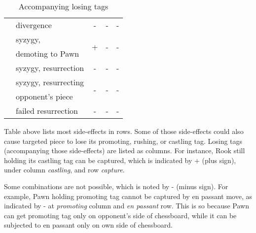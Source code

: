 \begin{table}[!h]
\begin{tabular}{ rlccc }
\alg{/}                     & divergence            & -                    & -                     & -                     \\
\cmidrule{1-5} %
\multirow{2}{*}{\alg{>}}    & syzygy,               & \multirow{2}{*}{+}   & \multirow{2}{*}{-}    & \multirow{2}{*}{-}    \\
                            & demoting to Pawn      &                      &                       &                       \\
\cmidrule{1-5} %
\alg{\$}                    & syzygy, resurrection  & -                    & -                     & -                     \\
\cmidrule{1-5} %
\multirow{2}{*}{\alg{\$\$}} & syzygy, resurrecting  & \multirow{2}{*}{-}   & \multirow{2}{*}{-}    & \multirow{2}{*}{-}    \\
                            & opponent's piece      &                      &                       &                       \\
\cmidrule{1-5} %
\alg{\$\$\$}                & failed resurrection   & -                    & -                     & -                     \\
\bottomrule %
\end{tabular}
\caption{Accompanying losing tags}
\label{tbl:Appendix/Summary/Accompanying-losing-tags}
\end{table}

Table above lists most side-effects in rows. Some of those side-effects could also cause
targeted piece to lose its promoting, rushing, or castling tag. Losing tags (accompanying
those side-effects) are listed as columns. For instance, Rook still holding its castling
tag can be captured, which is indicated by + (plus sign), under column \emph{castling},
and row \emph{capture}.

Some combinations are not possible, which is noted by - (minus sign). For example, Pawn
holding promoting tag cannot be captured by en passant move, as indicated by - at
\emph{promoting} column and \emph{en passant} row. This is so because Pawn can get
promoting tag only on opponent's side of chessboard, while it can be subjected to en passant
only on own side of chessboard.

